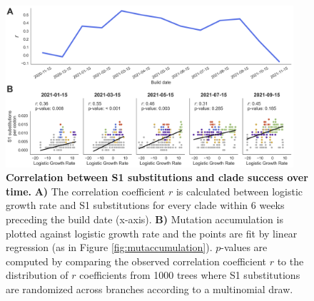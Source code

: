 \documentclass[11pt,oneside,letterpaper]{article}
\begin{document}
\begin{figure}[h!]
\centerline{\includegraphics[width=0.95\textwidth]{disc_supp_r_over_time.png}}
\caption{\textbf{Correlation between S1 substitutions and clade success over time.}
\textbf{A)} The correlation coefficient $r$ is calculated between logistic growth rate and S1 substitutions for every clade within 6 weeks preceding the build date (x-axis).
\textbf{B)} Mutation accumulation is plotted against logistic growth rate and the points are fit by linear regression (as in Figure \ref{fig:mutaccumulation}). $p$-values are computed by comparing the observed correlation coefficient $r$ to the distribution of $r$ coefficients from 1000 trees where S1 substitutions are randomized across branches according to a multinomial draw.
}
\label{fig:rovertime}
\end{figure}
\end{document}
